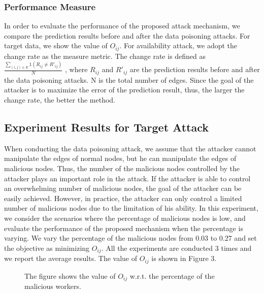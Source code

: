 \documentclass{acmtog} %
\begin{document}
\subsubsection{Performance Measure}
In order to evaluate the performance of the proposed attack mechanism, we compare the prediction results before and after the data poisoning attacks. For target data, we show the value of $O_{ij}$. For availability attack, we adopt the change rate as the measure metric. The change rate is defined as $\frac{\sum_{(i,j)\in E} 1(R_{ij}\ne R'_{ij})}{N}$ , where $R_{ij}$ and $R'_{ij}$ are the prediction results before and after the data poisoning attacks. N is the total number of edges. Since the goal of the attacker is to maximize the error of the prediction result, thus, the larger the change rate, the better the method.
\subsection{Experiment Results for Target Attack}
When conducting the data poisoning attack, we assume that the attacker cannot manipulate the edges of normal nodes, but he can manipulate the edges of malicious nodes. Thus, the number of the malicious nodes controlled by the attacker plays an important role in the attack. If the attacker is able to control an overwhelming number of malicious nodes, the goal of the attacker can be easily achieved. However, in practice, the attacker can only control a limited number of malicious nodes due to the limitation of his ability. In this experiment, we consider the scenarios where the percentage of malicious nodes is low, and evaluate the performance of the proposed mechanism when the percentage is varying. We vary the percentage of the malicious nodes from 0.03 to 0.27 and set the objective as minimizing $O_{ij}$. All the experiments are conducted 3 times and we report the average results. The value of $O_{ij}$ is shown in Figure 3.
\begin{figure}[t]
\caption{The figure shows the value of $O_{ij}$ w.r.t. the percentage of the malicious
	workers. }
\end{figure}
\end{document}
